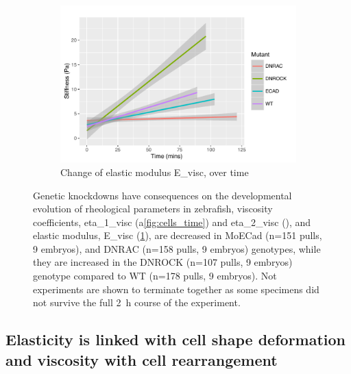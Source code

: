 \begin{figure}
  \ContinuedFloat
   \begin{subfigure}[t]{1\linewidth}
   \centering
   \includegraphics{Chapters/tweezers/Figs/PDF/Stiffness_-_Time}
   \caption{Change of elastic modulus \gls{E_visc}, over time}
   \label{fig:stiffness_time}
  \end{subfigure}\hfill
  \caption{
Genetic knockdowns have consequences on the developmental evolution of rheological parameters in \gls{zebrafish}, viscosity coefficients, \gls{eta_1_visc} (a\ref{fig:cells_time}) and \gls{eta_2_visc} (), and elastic modulus, \gls{E_visc} (\ref{fig:stiffness_time}), are decreased in MoECad (n=151 pulls, 9 embryos), and \gls{DNRAC} (n=158 pulls, 9 embryos) genotypes, while they are increased in the \gls{DNROCK} (n=107 pulls, 9 embryos) genotype compared to \gls{WT} (n=178 pulls, 9 embryos).
Not experiments are shown to terminate together as some specimens did not survive the full \SI{2}{\hour} course of the experiment.
  }\label{fig:visco_time}
\end{figure}

\subsection{Elasticity is linked with cell shape deformation and viscosity with cell rearrangement}

